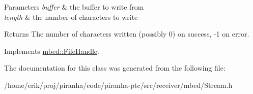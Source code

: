 \begin{DoxyParams}{Parameters}
{\em buffer} & the buffer to write from \\
\hline
{\em length} & the number of characters to write\\
\hline
\end{DoxyParams}
\begin{DoxyReturn}{Returns}
The number of characters written (possibly 0) on success, -\/1 on error. 
\end{DoxyReturn}


Implements \hyperlink{classmbed_1_1FileHandle_afecb50bd072d06e2a56dbc4f4e68bbf5}{mbed\+::\+File\+Handle}.



The documentation for this class was generated from the following file\+:\begin{DoxyCompactItemize}
\item 
/home/erik/proj/piranha/code/piranha-\/ptc/src/receiver/mbed/Stream.\+h\end{DoxyCompactItemize}
